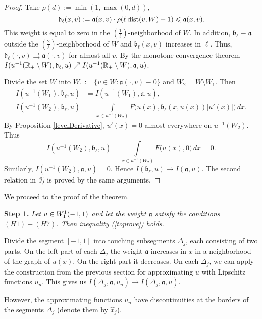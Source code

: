 \begin{proof}
Take $\rho(d) := \min(1, \max(0, d))$,
$$\mathfrak b_{\ell}(x, v) := \mathfrak a(x, v) \cdot \rho(\ell \mathop{\rm dist}\nolimits(v, W) - 1) \leqslant \mathfrak a(x, v).$$
This weight is equal to zero in the $\left(\frac{1}{\ell}\right)$-neighborhood of $W$.
In addition, $\mathfrak b_{\ell} \equiv \mathfrak a$ outside the $\left(\frac{2}{\ell}\right)$-neighborhood of $W$ and
$\mathfrak b_{\ell}(x, v)$ increases in $\ell$.
Thus, $\mathfrak b_{\ell}(\cdot, v) \rightrightarrows \mathfrak a(\cdot, v)$ for almost all $v$.
By the monotone convergence theorem
$I(u^{-1}(\mathbb R_+ \setminus W), \mathfrak b_{\ell}, u) \nearrow I(u^{-1}(\mathbb R_+ \setminus W), \mathfrak a, u)$.

Divide the set $W$ into $W_1 := \{v \in W: \mathfrak a(\cdot, v) \equiv 0\}$ and $W_2 = W \setminus W_1$.
Then
$$
\begin{aligned}
I(u^{-1}(W_1), \mathfrak b_{\ell}, u) &= I(u^{-1}(W_1), \mathfrak a, u),\\
I(u^{-1}(W_2), \mathfrak b_{\ell}, u) &= \int\limits_{x \in u^{-1}(W_2)} F\big(u(x), \mathfrak b_{\ell}(x, u(x)) |u'(x)|\big) \, dx.
\end{aligned}
$$
By Proposition \ref{levelDerivative}, $u'(x) = 0$ almost everywhere on $u^{-1}(W_2)$.
Thus
$$I(u^{-1}(W_2), \mathfrak b_{\ell}, u) = \int\limits_{x \in u^{-1}(W_2)} F\big(u(x), 0\big) \, dx = 0.$$
Similarly, $I(u^{-1}(W_2), \mathfrak a, u) = 0$. Hence $I(\mathfrak b_{\ell}, u) \to I(\mathfrak a, u)$.
The second relation in {\it 3)} is proved by the same arguments.
\end{proof}

We proceed to the proof of the theorem.

\bigskip
{\bf Step 1.} {\it Let $u \in W_1^1(-1, 1)$ and let the weight $\mathfrak a$ satisfy the conditions $(H1)-(H7)$.
Then inequality (\ref{toprove}) holds.}

Divide the segment $[-1, 1]$ into touching subsegments $\Delta_j$, each consisting of two parts.
On the left part of each $\Delta_j$ the weight $\mathfrak a$ increases in $x$ in a neighborhood
of the graph of $u(x)$. On the right part it decreases.
On each $\Delta_j$, we can apply the construction from the previous section
for approximating $u$ with Lipschitz functions $u_n$.
This gives us $I(\Delta_j, \mathfrak a, u_n) \to I(\Delta_j, \mathfrak a, u)$.

However, the approximating functions $u_n$ have discontinuities at the borders of the segments $\Delta_j$
(denote them by $\hat{x}_j$).

